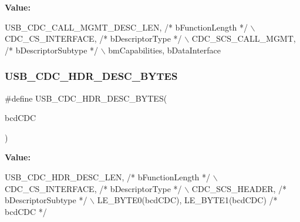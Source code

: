 {\bfseries Value\+:}
\begin{DoxyCode}
USB\_CDC\_CALL\_MGMT\_DESC\_LEN, \textcolor{comment}{/* bFunctionLength */}                                                          
              \(\backslash\)
        CDC\_CS\_INTERFACE,       \textcolor{comment}{/* bDescriptorType */}                                                      
                  \(\backslash\)
        CDC\_SCS\_CALL\_MGMT,      \textcolor{comment}{/* bDescriptorSubtype */}                                                   
                  \(\backslash\)
        bmCapabilities, bDataInterface
\end{DoxyCode}
\mbox{\label{group__cdc__protocol__group_gad9edda44e062f6177d1c2c6dc29a04d3}} 
\subsubsection{\texorpdfstring{U\+S\+B\+\_\+\+C\+D\+C\+\_\+\+H\+D\+R\+\_\+\+D\+E\+S\+C\+\_\+\+B\+Y\+T\+ES}{USB\_CDC\_HDR\_DESC\_BYTES}}
{\footnotesize\ttfamily \#define U\+S\+B\+\_\+\+C\+D\+C\+\_\+\+H\+D\+R\+\_\+\+D\+E\+S\+C\+\_\+\+B\+Y\+T\+ES(\begin{DoxyParamCaption}\item[{}]{bcd\+C\+DC }\end{DoxyParamCaption})}

{\bfseries Value\+:}
\begin{DoxyCode}
USB\_CDC\_HDR\_DESC\_LEN,                  \textcolor{comment}{/* bFunctionLength */}                                               
              \(\backslash\)
        CDC\_CS\_INTERFACE,                  \textcolor{comment}{/* bDescriptorType */}                                           
                  \(\backslash\)
        CDC\_SCS\_HEADER,                    \textcolor{comment}{/* bDescriptorSubtype */}                                        
                  \(\backslash\)
        LE\_BYTE0(bcdCDC), LE\_BYTE1(bcdCDC) \textcolor{comment}{/* bcdCDC */}
\end{DoxyCode}
